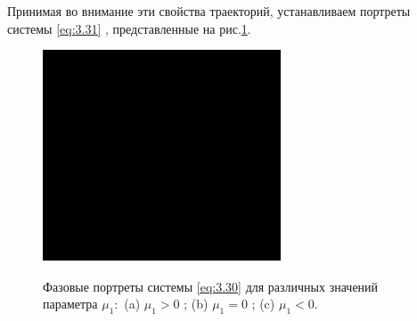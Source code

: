 Принимая во внимание эти свойства траекторий, устанавливаем портреты системы \eqref{eq:3.31} , представленные на рис.\ref{fig:3.9}.
        
\begin{figure}[h!]
        \centering
        \includegraphics[width=0.5\linewidth]{fig/lect3/9a}
        \label{fig:3.9}
        \caption{Фазовые портреты системы \eqref{eq:3.30}  для различных значений параметра $\mu_1:$
        (a) $\mu_1>0$ ; (b) $\mu_1=0$ ; (c) $\mu_1<0$.}
\end{figure}
